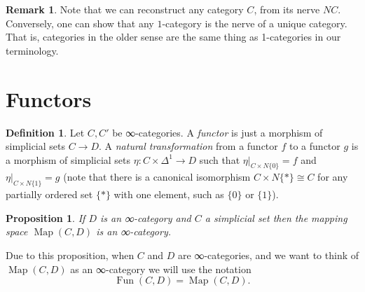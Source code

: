 \documentclass[a4paper]{amsart}
\numberwithin{figure}{section}
\theoremstyle{theorem}
\newtheorem{prop}[thm]{Proposition}
\theoremstyle{definition}
\newtheorem{defi}[thm]{Definition}
\newtheorem{rema}[thm]{Remark}
\DeclareMathOperator{\Fun}{Fun}
\DeclareMathOperator{\Map}{Map}
\begin{document}
\begin{rema}
Note that we can reconstruct any category $C$, from its nerve $NC$. Conversely, one can show that any $1$-category is the nerve of a unique category. That is, categories in the older sense are the same thing as 1-categories in our terminology.
\end{rema}

\section{Functors}

\begin{mdframed}
\begin{defi}
Let $C, C'$ be ∞-categories. A \emph{functor} is just a morphism of simplicial sets $C \to D$. A \emph{natural transformation} from a functor $f$ to a functor $g$ is a morphism of simplicial sets $\eta: C \times \Delta^1 \to D$ such that $\eta|_{C \times N\{0\}} = f$ and $\eta|_{C \times N\{1\}} = g$ (note that there is a canonical isomorphism $C \times N\{\ast\} \cong C$ for any partially ordered set $\{\ast\}$ with one element, such as $\{0\}$ or $\{1\}$).
\end{defi}
\end{mdframed} 

\vspace{\baselineskip}

\begin{mdframed}
\begin{prop}
If $D$ is an ∞-category and $C$ a simplicial set then the mapping space $\Map(C, D)$ is an ∞-category. 
\end{prop}
\end{mdframed}

\vspace{\baselineskip}

\begin{mdframed}
Due to this proposition, when $C$ and $D$ are ∞-categories, and we want to think of $\Map(C, D)$ as an ∞-category we will use the notation 
\[ \Fun(C, D) = \Map(C, D). \] 
\end{mdframed}
\end{document}
